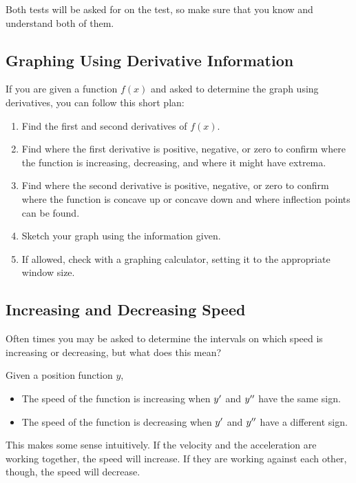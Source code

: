 Both tests will be asked for on the test, so make sure that you know and understand both of them.

\subsection{Graphing Using Derivative Information}

If you are given a function \( f \left( x \right) \) and asked to determine the graph using derivatives, you can follow this short plan:

\begin{enumerate}
    \item Find the first and second derivatives of \( f \left( x \right) \).
    \item Find where the first derivative is positive, negative, or zero to confirm where the function is increasing, decreasing, and where it might have extrema.
    \item Find where the second derivative is positive, negative, or zero to confirm where the function is concave up or concave down and where inflection points can be found.
    \item Sketch your graph using the information given.
    \item If allowed, check with a graphing calculator, setting it to the appropriate window size.
\end{enumerate}

\subsection{Increasing and Decreasing Speed}

Often times you may be asked to determine the intervals on which speed is increasing or decreasing, but what does this mean?

Given a position function \( y \),

\begin{itemize}
    \item The speed of the function is increasing when \( y^\prime \) and \( y^{\prime\prime} \) have the same sign.
    \item The speed of the function is decreasing when \( y^\prime \) and \( y^{\prime\prime} \) have a different sign.
\end{itemize}

This makes some sense intuitively. If the velocity and the acceleration are working together, the speed will increase. If they are working against each other, though, the speed will decrease.

